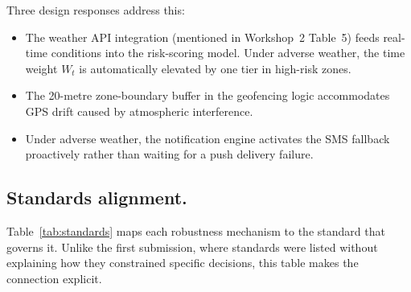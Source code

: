 \documentclass[12pt,a4paper]{article}
\begin{document}
Three design responses address this:
\begin{itemize}
\item The weather API integration (mentioned in Workshop~2 Table~5)
  feeds real-time conditions into the risk-scoring model. Under
  adverse weather, the time weight $W_t$ is automatically elevated
  by one tier in high-risk zones.
\item The 20-metre zone-boundary buffer in the geofencing logic
  accommodates GPS drift caused by atmospheric interference.
\item Under adverse weather, the notification engine activates the
  SMS fallback proactively rather than waiting for a push delivery
  failure.
\end{itemize}

\subsection{Standards alignment.}
Table~\ref{tab:standards} maps each robustness mechanism to the
standard that governs it. Unlike the first submission, where
standards were listed without explaining how they constrained
specific decisions, this table makes the connection explicit.
\end{document}
